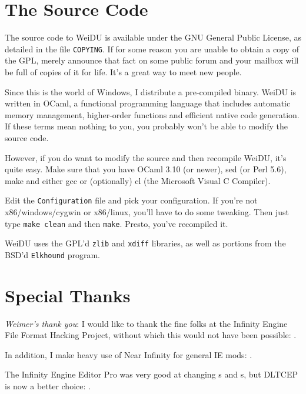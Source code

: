 \documentclass{article}
\def\ttref#1{\ahrefloc{#1}{\tt #1}}
\def\t#1{{\tt #1}}
\begin{document}
\section{The Source Code}

The source code to WeiDU is available under the GNU General Public License,
as detailed in the file \t{COPYING}. If for some reason you are unable to
obtain a copy of the GPL, merely announce that fact on some public forum
and your mailbox will be full of copies of it for life. It's a great way to
meet new people.

Since this is the world of Windows, I distribute a pre-compiled binary.
WeiDU is written in OCaml, a functional programming language that includes
automatic memory management, higher-order functions and efficient native
code generation. If these terms mean nothing to you, you probably won't be
able to modify the source code.

However, if you do want to modify the source and then recompile WeiDU, it's
quite easy. Make sure that you have OCaml 3.10 (or newer), sed (or Perl
5.6), make and either gcc or (optionally) cl (the Microsoft Visual C
Compiler).

Edit the \t{Configuration} file and pick your configuration. If you're not
x86/windows/cygwin or x86/linux, you'll have to do some tweaking. Then just
type \t{make clean} and then \t{make}. Presto, you've recompiled it.

WeiDU uses the GPL'd \t{zlib} and \t{xdiff} libraries, as well as portions from
the BSD'd \t{Elkhound} program.

\section{Special Thanks}
{\em Weimer's thank you}:
I would like to thank the fine folks at the Infinity Engine File Format
Hacking Project, without which this would not have been possible:
.

In addition, I make heavy use of Near Infinity for general IE mods: .

The Infinity Engine Editor Pro was very good at changing \ttref{ITM}s and
\ttref{SPL}s, but DLTCEP is now a better choice:
.
\end{document}
